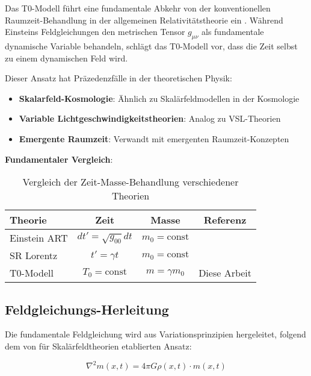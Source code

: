 \documentclass[12pt,a4paper]{article}
\begin{document}
	Das T0-Modell führt eine fundamentale Abkehr von der konventionellen Raumzeit-Behandlung in der allgemeinen Relativitätstheorie ein \citep{einstein1915,misner1973,weinberg1972}. Während Einsteins Feldgleichungen den metrischen Tensor $g_{\mu\nu}$ als fundamentale dynamische Variable behandeln, schlägt das T0-Modell vor, dass die Zeit selbst zu einem dynamischen Feld wird.
	
	Dieser Ansatz hat Präzedenzfälle in der theoretischen Physik:
	\begin{itemize}
		\item \textbf{Skalarfeld-Kosmologie}: Ähnlich zu Skalärfeldmodellen in der Kosmologie \citep{weinberg2008,peebles1993}
		\item \textbf{Variable Lichtgeschwindigkeitstheorien}: Analog zu VSL-Theorien \citep{barrow1999,albrecht1999}
		\item \textbf{Emergente Raumzeit}: Verwandt mit emergenten Raumzeit-Konzepten \citep{jacobson1995,verlinde2011}
	\end{itemize}
	
	\textbf{Fundamentaler Vergleich}:
	\begin{table}[htbp]
		\centering
		\begin{tabular}{|l|c|c|c|}
			\hline
			\textbf{Theorie} & \textbf{Zeit} & \textbf{Masse} & \textbf{Referenz} \\
			\hline
			Einstein ART & $dt' = \sqrt{g_{00}} dt$ & $m_0 = \text{const}$ & \citep{einstein1915,misner1973} \\
			SR Lorentz & $t' = \gamma t$ & $m_0 = \text{const}$ & \citep{einstein1905,jackson1998} \\
			T0-Modell & $T_0 = \text{const}$ & $m = \gamma m_0$ & Diese Arbeit \\
			\hline
		\end{tabular}
		\caption{Vergleich der Zeit-Masse-Behandlung verschiedener Theorien}
		\label{tab:theory_comparison}
	\end{table}
	
	\subsection{Feldgleichungs-Herleitung}
	\label{subsec:field_equation_derivation}
	
	Die fundamentale Feldgleichung wird aus Variationsprinzipien hergeleitet, folgend dem von \citet{weinberg1995} für Skalärfeldtheorien etablierten Ansatz:
	
	\begin{equation}
		\label{eq:field_equation_fundamental}
		\nabla^2 m(x,t) = 4\pi G \rho(x,t) \cdot m(x,t)
	\end{equation}
	
\end{document}
